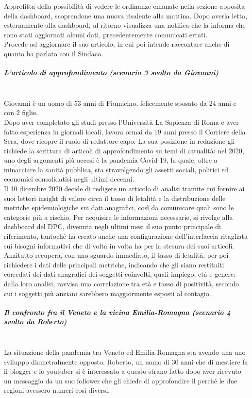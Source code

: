 Approfitta della possibilità di vedere le ordinanze emanate nella sezione apposita della dashboard, scoprendone una nuova risalente alla mattina.
Dopo averla letta, esternamente alla dashboard, al ritorno visualizza una notifica che la informa che sono stati aggiornati alcuni dati, precedentemente comunicati errati.\\
Procede ad aggiornare il suo articolo, in cui poi intende raccontare anche di quanto ha parlato con il Sindaco.
\noindent
\subparagraph{L'articolo di approfondimento (scenario 3 svolto da Giovanni)}\mbox{}\\
Giovanni è un uomo di 53 anni di Fiumicino, felicemente sposato da 24 anni e con 2 figlie.\\
Dopo aver completato gli studi presso l'Università La Sapienza di Roma e aver fatto esperienza in giornali locali, lavora ormai da 19 anni presso il Corriere della Sera, dove ricopre il ruolo di redattore capo.
La sua posizione in redazione gli richiede la scrittura di articoli di approfondimento su temi di attualità: nel 2020, uno degli argomenti più accesi è la pandemia Covid-19, la quale, oltre a minacciare la sanità pubblica, sta stravolgendo gli assetti sociali, politici ed economici consolidatisi negli ultimi decenni.\\
Il 10 dicembre 2020 decide di redigere un articolo di analisi tramite cui fornire ai suoi lettori insight di valore circa il tasso di letalità e la distribuzione delle metriche epidemiologiche sui dati anagrafici, così da comunicare quali sono le categorie più a rischio.
Per acquisire le informazioni necessarie, si rivolge alla dashboard del DPC, divenuta negli ultimi mesi il suo punto principale di riferimento, tantoché ha creato anche una configurazione dell'interfaccia ritagliata sui bisogni informativi che di volta in volta ha per la stesura dei suoi articoli.
Anzitutto recupera, con uno sguardo immediato, il tasso di letalità, per poi richiedere i dati delle principali metriche, indicando che gli siano restituiti corredati dei dati anagrafici dei soggetti coinvolti, quali impiego, età e genere: dalla loro analisi, ravvisa una correlazione tra età e tasso di positività, secondo cui i soggetti più anziani sarebbero maggiormente esposti al contagio. 
\noindent
\subparagraph{Il confronto fra il Veneto e la vicina Emilia-Romagna (scenario 4 svolto da Roberto)}\mbox{}\\
La situazione della pandemia tra Veneto ed Emilia-Romagna sta avendo una uno sviluppo diametralmente opposto.
Roberto, un uomo di 30 anni che di mestiere fa il blogger e lo youtuber si è interessato a questo strano fatto dopo aver ricevuto un messaggio da un suo follower che gli chiede di approfondire il perché le due regioni avessero numeri così diversi.\\
